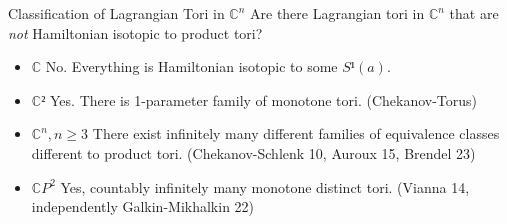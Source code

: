 \documentclass[handout,aspectratio=169]{beamer}
\begin{document}
\begin{frame}{Classification of Lagrangian Tori in $ℂ^n$}
  Are there Lagrangian tori in $ℂ^n$ that are \emph{not} Hamiltonian isotopic to product tori?

  \begin{itemize}
    \item<2-> $ℂ$ No. Everything is Hamiltonian isotopic to some $S¹(a)$.
    
    \item<3-> $ℂ²$ Yes. There is 1-parameter family of monotone tori. (Chekanov-Torus)
    
    \item<4-> $ℂ^n, n ≥ 3$ There exist infinitely many different families of equivalence classes different to product tori. (Chekanov-Schlenk 10, Auroux 15, Brendel 23)
    
    \item<5-> $ℂP^2$ Yes, countably infinitely many monotone distinct tori. (Vianna 14, independently Galkin-Mikhalkin 22)
  \end{itemize}
\end{frame}
\end{document}
